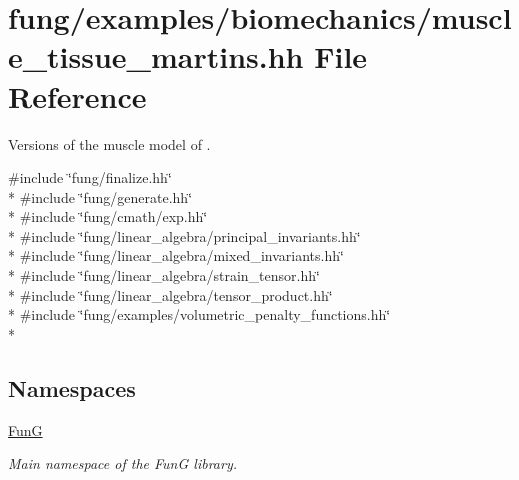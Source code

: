 \hypertarget{muscle__tissue__martins_8hh}{}\section{fung/examples/biomechanics/muscle\+\_\+tissue\+\_\+martins.hh File Reference}
\label{muscle__tissue__martins_8hh}


Versions of the muscle model of \cite{Martins1998}.  


{\ttfamily \#include \char`\"{}fung/finalize.\+hh\char`\"{}}\\*
{\ttfamily \#include \char`\"{}fung/generate.\+hh\char`\"{}}\\*
{\ttfamily \#include \char`\"{}fung/cmath/exp.\+hh\char`\"{}}\\*
{\ttfamily \#include \char`\"{}fung/linear\+\_\+algebra/principal\+\_\+invariants.\+hh\char`\"{}}\\*
{\ttfamily \#include \char`\"{}fung/linear\+\_\+algebra/mixed\+\_\+invariants.\+hh\char`\"{}}\\*
{\ttfamily \#include \char`\"{}fung/linear\+\_\+algebra/strain\+\_\+tensor.\+hh\char`\"{}}\\*
{\ttfamily \#include \char`\"{}fung/linear\+\_\+algebra/tensor\+\_\+product.\+hh\char`\"{}}\\*
{\ttfamily \#include \char`\"{}fung/examples/volumetric\+\_\+penalty\+\_\+functions.\+hh\char`\"{}}\\*
\subsection*{Namespaces}
\begin{DoxyCompactItemize}
\item 
 \hyperlink{namespaceFunG}{FunG}
\begin{DoxyCompactList}\small\item\em Main namespace of the FunG library. \end{DoxyCompactList}\end{DoxyCompactItemize}
